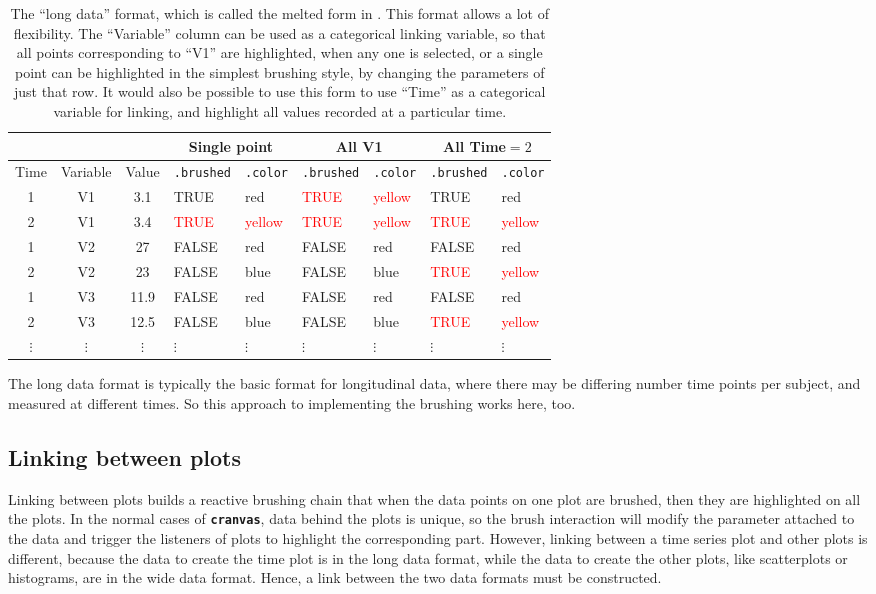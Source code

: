 \documentclass[12pt]{article}
\providecommand{\tabularnewline}{\\}
\begin{document}
\begin{table}[H]%
\begin{center}
\begin{tabular}{|c|cc|ll||ll||ll|}
\hline
\multicolumn{1}{|c}{} & \multicolumn{2}{c|}{} & \multicolumn{2}{c||}{Single point}& \multicolumn{2}{c||}{All V1}& \multicolumn{2}{c|}{All Time$=2$}\tabularnewline
\hline
Time & Variable & Value & \texttt{.brushed} & \texttt{.color} & \texttt{.brushed} & \texttt{.color} & \texttt{.brushed} & \texttt{.color}\tabularnewline
\hline
1 & V1 & 3.1 & TRUE & red & \textcolor{red}{TRUE} & \textcolor{red}{yellow} & TRUE & red \tabularnewline
2 & V1 & 3.4 & \textcolor{red}{TRUE} & \textcolor{red}{yellow} & \textcolor{red}{TRUE} & \textcolor{red}{yellow} & \textcolor{red}{TRUE} & \textcolor{red}{yellow}\tabularnewline
1 & V2 & 27 & FALSE & red & FALSE & red & FALSE & red\tabularnewline
2 & V2 & 23 & FALSE & blue & FALSE & blue & \textcolor{red}{TRUE} & \textcolor{red}{yellow} \tabularnewline
1 & V3 & 11.9 & FALSE & red & FALSE & red & FALSE & red \tabularnewline
2 & V3 & 12.5 & FALSE & blue & FALSE & blue & \textcolor{red}{TRUE} & \textcolor{red}{yellow}\tabularnewline
$\vdots$ & $\vdots$ & $\vdots$ & $\vdots$ & $\vdots$ & $\vdots$ & $\vdots$ & $\vdots$ & $\vdots$ \tabularnewline
\hline
\end{tabular}
\end{center}
\caption{\label{tab:long-data}The ``long data'' format, which is called the melted form in \citet{reshape}. This format allows a lot of flexibility. The ``Variable'' column can be used as a categorical linking variable, so that all points corresponding to ``V1'' are highlighted, when any one is selected, or a single point can be highlighted in the simplest brushing style, by changing the parameters of just that row. It would also be possible to use this form to use ``Time'' as a categorical variable for linking, and highlight all values recorded at a particular time. }
\end{table}

The long data format is typically the basic format
for longitudinal data, where there may be differing
number time points per subject, and measured at
different times. So this approach to implementing
the brushing works here, too.


\subsection{Linking between plots}

Linking between plots builds a reactive brushing chain that
when the data points on one plot are brushed, then they are
highlighted on all the plots. In the normal cases of
\texttt{\textbf{cranvas}}, data behind the plots is unique,
so the brush interaction will modify the parameter attached
to the data and trigger the listeners of plots to highlight
the corresponding part. However, linking between a time
series plot and other plots is different, because the
data to create the time plot is in the long data format,
while the data to create the other plots, like scatterplots
or histograms, are in the wide data format. Hence, a link
between the two data formats must be constructed.
\end{document}
